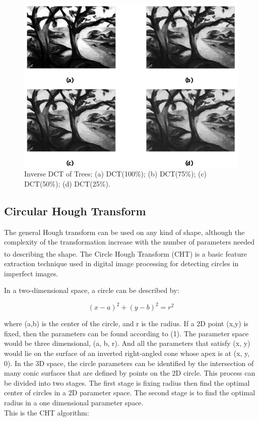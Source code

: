 \begin{figure}[H]
\centering
    \centerline{\includegraphics[width = 5.2in]{../images/inverse-DCT-of-trees.png}}
    \caption{Inverse DCT of Trees; (a) DCT(100\%); (b) DCT(75\%); (c) DCT(50\%); (d) DCT(25\%).}
\end{figure}

\subsection{Circular Hough Transform}
\hspace{\parindent}
The general Hough transform can be used on any kind of shape, although the complexity of the transformation increase with the number of parameters needed to describing the shape. \textsuperscript{\cite{pedersen2007circular}}
The Circle Hough Transform (CHT) is a basic feature extraction technique used in digital image processing for detecting circles in imperfect images.

In a two-dimensional space, a circle can be described by:

\begin{equation}
    (x - a)^2 + (y - b)^2 = r^2
\end{equation}

where (a,b) is the center of the circle, and r is the radius. If a 2D point (x,y) is fixed, then the parameters can be found according to (1). The parameter space would be three dimensional, (a, b, r). And all the parameters that satisfy (x, y) would lie on the surface of an inverted right-angled cone whose apex is at (x, y, 0). In the 3D space, the circle parameters can be identified by the intersection of many conic surfaces that are defined by points on the 2D circle. This process can be divided into two stages. The first stage is fixing radius then find the optimal center of circles in a 2D parameter space. The second stage is to find the optimal radius in a one dimensional parameter space.\\
This is the CHT algorithm:

